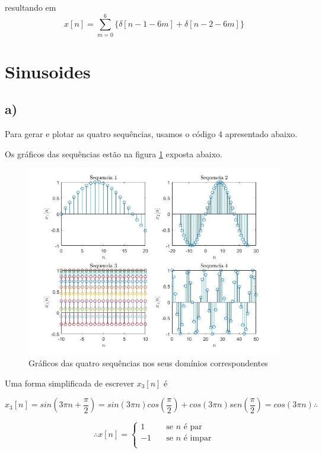 \documentclass[a4paper, 12pt]{article}
\begin{document}
resultando em $$ x[n] = \sum_{m=0}^6\lbrace\delta[n-1-6m] + \delta[n-2-6m]\rbrace$$

\section{Sinusoides}

\subsection{a)}

Para gerar e plotar as quatro sequências, usamos o código 4 apresentado abaixo.



Os gráficos das sequências estão na figura \ref{fig:2a} exposta abaixo.

\begin{figure}[H]
	\centering
	\includegraphics[scale=0.7]{../Imagens/ex2/a.jpg}  
	\caption{Gráficos das quatro sequências nos seus domínios correspondentes}
	\label{fig:2a}
\end{figure}

Uma forma simplificada de escrever $x_3[n]$ é 

$$ x_3[n]=sin(3\pi n+\frac{\pi}{2})=sin(3\pi n)cos(\frac{\pi}{2}) + cos(3\pi n)sen(\frac{\pi}{2})=cos(3\pi n)\therefore$$

\[\therefore   
x[n] = 
     \begin{cases}
       1 &\quad\text{se } n \text{ é par}\\
       -1 &\quad\text{se } n \text{ é impar}\\
     \end{cases}
\]
\end{document}
